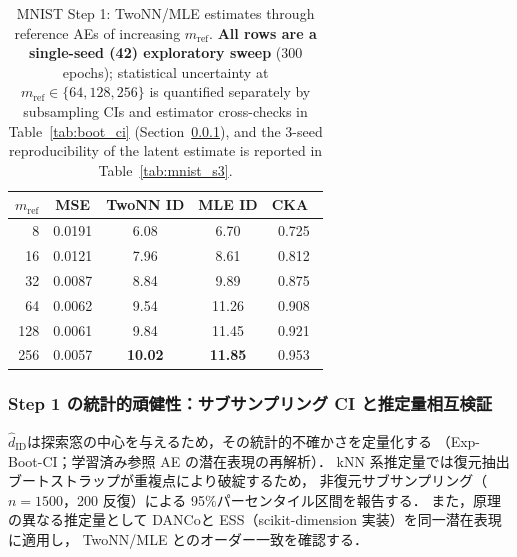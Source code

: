 \documentclass[11pt,a4paper]{jsarticle}
\newcommand{\hatdID}{\hat{d}_{\mathrm{ID}}}
\begin{document}
\begin{table}[H]
\centering
\caption{MNIST Step 1: TwoNN/MLE estimates through reference AEs of
increasing $m_{\mathrm{ref}}$. \textbf{All rows are a single-seed (42)
exploratory sweep} (300 epochs); statistical uncertainty at
$m_{\mathrm{ref}} \in \{64, 128, 256\}$ is quantified separately by
subsampling CIs and estimator cross-checks in
Table~\ref{tab:boot_ci} (Section~\ref{sec:exp_mnist_ci}), and the 3-seed
reproducibility of the latent estimate is reported in
Table~\ref{tab:mnist_s3}.}
\label{tab:mnist_s1}
\small
\begin{tabular}{rcccc}
\toprule
$m_{\mathrm{ref}}$ & MSE & TwoNN ID & MLE ID & CKA~\cite{kornblith2019cka} \\
\midrule
8   & 0.0191 & 6.08 & 6.70 & 0.725 \\
16  & 0.0121 & 7.96 & 8.61 & 0.812 \\
32  & 0.0087 & 8.84 & 9.89 & 0.875 \\
64  & 0.0062 & 9.54 & 11.26 & 0.908 \\
128 & 0.0061 & 9.84 & 11.45 & 0.921 \\
256 & 0.0057 & \textbf{10.02} & \textbf{11.85} & 0.953 \\
\bottomrule
\end{tabular}
\end{table}

\subsubsection{Step 1 の統計的頑健性：サブサンプリング CI と推定量相互検証}
\label{sec:exp_mnist_ci}

$\hatdID$は探索窓の中心を与えるため，その統計的不確かさを定量化する
（Exp-Boot-CI；学習済み参照 AE の潜在表現の再解析）．
kNN 系推定量では復元抽出ブートストラップが重複点により破綻するため，
非復元サブサンプリング（$n = 1500$，200 反復）による
95\%パーセンタイル区間を報告する．
また，原理の異なる推定量として DANCo\cite{ceruti2014danco}と
ESS\cite{johnsson2015ess}（scikit-dimension 実装）を同一潜在表現に適用し，
TwoNN/MLE とのオーダー一致を確認する．
\end{document}
